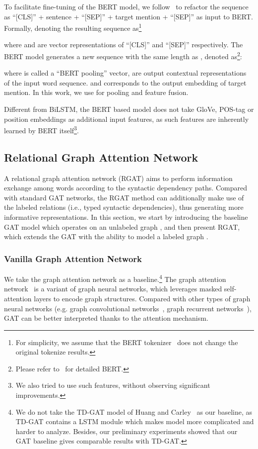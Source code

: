 \documentclass[journal]{IEEEtran}
\begin{document}
	To facilitate fine-tuning of the BERT model, we follow~\cite{Song2019AttentionalEN} to refactor the sequence as ``[CLS]'' + sentence + ``[SEP]'' + target mention + ``[SEP]'' as input to BERT. 
	Formally, denoting the resulting sequence as\footnote{For simplicity, we assume that the BERT tokenizer~\cite{google16} does not change the original tokenize results.} 
	
	where  and  are vector representations of ``[CLS]'' and ``[SEP]'' respectively. 
	The BERT model generates a new sequence with the same length as , denoted as\footnote{Please refer to~\cite{devlin-etal-2019-bert} for detailed BERT.}: 
	
	where  is called a ``BERT pooling'' vector,  are output contextual representations of the input word sequence. 
	and  corresponds to the output embedding of target mention.
	In this work, we use  for pooling and feature fusion.
	
	Different from BiLSTM, the BERT based model does not take GloVe, POS-tag or position embeddings as additional input features, as such features are inherently learned by BERT itself\footnote{We also tried to use such features, without observing significant improvements.}.
	
	\subsection{Relational Graph Attention Network}
	\label{sec:rgat}
	A relational graph attention network (RGAT) aims to perform information exchange among words according to the syntactic dependency paths. 
	Compared with standard  GAT networks, the RGAT method can additionally make use of the labeled relations (i.e., typed syntactic dependencies), thus generating more informative representations.
	In this section, we start by introducing the baseline GAT model which operates on an unlabeled graph , and then present RGAT, which extends the GAT with the ability to model a labeled graph .
	
	\subsubsection{Vanilla Graph Attention Network}
	We take the graph attention network as a baseline.\footnote{We do not take the TD-GAT model of Huang and Carley~\cite{huang-carley-2019-syntax} as our baseline, as TD-GAT contains a LSTM module which makes model more complicated and harder to analyze. 
		Besides, our preliminary experiments showed that our GAT baseline gives comparable results with TD-GAT.}
	The graph attention network~\cite{velickovic2018gat} is a variant of graph neural networks, which leverages masked self-attention layers to encode graph structures. 
	Compared with other types of graph neural networks (e.g. graph convolutional networks~\cite{kipf2017semi}, graph recurrent networks~\cite{song-etal-2018-graph}), 
	GAT can be better interpreted thanks to the attention mechanism.
	
\end{document}
